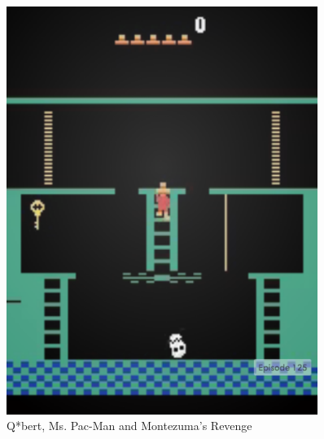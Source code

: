 \documentclass[final]{beamer}
\newlength{\sepwid}
\newlength{\onecolwid}
\newlength{\twocolwid}
\begin{document}
\begin{frame}[t]
\begin{columns}[t]
\begin{column}{\onecolwid}
\begin{figure}[h]
\begin{minipage}{0.8\textwidth}
        \centering
        \includegraphics[scale=0.5]{MontezumaRevenge}
    \end{minipage}
    \caption{Q*bert, Ms. Pac-Man and Montezuma's Revenge}
\end{figure}


\end{column} %

\begin{column}{\sepwid}\end{column} %

\begin{column}{\twocolwid} %

\begin{columns}[t,totalwidth=\twocolwid] %

\begin{column}{\onecolwid}\vspace{-.6in} %


\end{column}
\end{columns}
\end{column}
\end{columns}
\end{frame}
\end{document}
